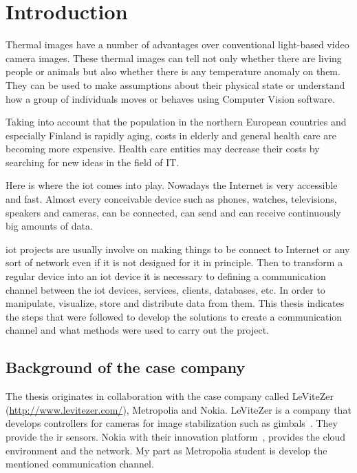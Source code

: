 \documentclass[hidelinks,11pt,a4paper,oneside,article]{memoir}
\begin{document}
\setcounter{page}{1} %
\ClearWallPaper

\sloppy %

\chapter{Introduction}\label{sec:introduction}


Thermal images have a number of advantages over conventional light-based video camera images.   These thermal images can tell not only whether there are living people or animals but also whether there is any temperature anomaly on them. They can be used to make assumptions about their physical state or understand how a group of individuals moves or behaves using Computer Vision software.

Taking into account that the population in the northern European countries and especially Finland is rapidly aging, costs in elderly and general health care are becoming more expensive. Health care entities may decrease their costs by searching for new ideas in the field of IT.

Here is where the \gls{iot} comes into play. Nowadays the Internet is very accessible and fast. Almost every conceivable device such as phones, watches, televisions, speakers and cameras, can be connected, can send and can receive continuously big amounts of data.

\gls{iot} projects are usually involve on making things to be connect to Internet or any sort of network even if it is not designed for it in principle. Then to transform a regular device into an \gls{iot} device it is necessary to defining a communication channel between the \gls{iot} devices, services, clients, databases, etc. In order to manipulate, visualize, store and distribute data from them. This thesis indicates the steps that were followed to develop the solutions to create a communication channel and what methods were used to carry out the project.


\section*{Background of the case company}
The thesis originates in collaboration with the case company called LeViteZer (\url{http://www.levitezer.com/}), Metropolia and Nokia.
 LeViteZer is a company that develops controllers for cameras for image stabilization such as gimbals~\cite{levitezer}. They provide the \gls{ir} sensors. Nokia with their innovation platform~\cite{nokiainnovation}, provides the cloud environment and the network. My part as Metropolia student is develop the mentioned communication channel.
\end{document}
